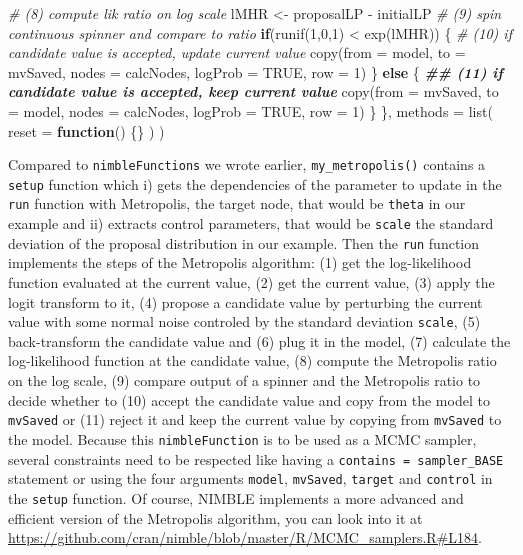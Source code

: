 \documentclass[
  12pt,
]{krantz}
\newenvironment{Shaded}{\begin{snugshade}}{\end{snugshade}}
\newcommand{\AttributeTok}[1]{\textcolor[rgb]{0.77,0.63,0.00}{#1}}
\newcommand{\CommentTok}[1]{\textcolor[rgb]{0.56,0.35,0.01}{\textit{#1}}}
\newcommand{\ConstantTok}[1]{\textcolor[rgb]{0.00,0.00,0.00}{#1}}
\newcommand{\ControlFlowTok}[1]{\textcolor[rgb]{0.13,0.29,0.53}{\textbf{#1}}}
\newcommand{\DecValTok}[1]{\textcolor[rgb]{0.00,0.00,0.81}{#1}}
\newcommand{\DocumentationTok}[1]{\textcolor[rgb]{0.56,0.35,0.01}{\textbf{\textit{#1}}}}
\newcommand{\FunctionTok}[1]{\textcolor[rgb]{0.00,0.00,0.00}{#1}}
\newcommand{\NormalTok}[1]{#1}
\newcommand{\OtherTok}[1]{\textcolor[rgb]{0.56,0.35,0.01}{#1}}
\newcommand{\SpecialCharTok}[1]{\textcolor[rgb]{0.00,0.00,0.00}{#1}}
\begin{document}
\begin{Shaded}
\begin{Highlighting}[]
    \CommentTok{\# (8) compute lik ratio on log scale}
\NormalTok{    lMHR }\OtherTok{\textless{}{-}}\NormalTok{ proposalLP }\SpecialCharTok{{-}}\NormalTok{ initialLP }
    \CommentTok{\# (9) spin continuous spinner and compare to ratio}
    \ControlFlowTok{if}\NormalTok{(}\FunctionTok{runif}\NormalTok{(}\DecValTok{1}\NormalTok{,}\DecValTok{0}\NormalTok{,}\DecValTok{1}\NormalTok{) }\SpecialCharTok{\textless{}} \FunctionTok{exp}\NormalTok{(lMHR)) \{ }
      \CommentTok{\# (10) if candidate value is accepted, update current value}
      \FunctionTok{copy}\NormalTok{(}\AttributeTok{from =}\NormalTok{ model, }\AttributeTok{to =}\NormalTok{ mvSaved, }\AttributeTok{nodes =}\NormalTok{ calcNodes, }\AttributeTok{logProb =} \ConstantTok{TRUE}\NormalTok{, }\AttributeTok{row =} \DecValTok{1}\NormalTok{)}
\NormalTok{    \} }\ControlFlowTok{else}\NormalTok{ \{}
      \DocumentationTok{\#\# (11) if candidate value is accepted, keep current value}
      \FunctionTok{copy}\NormalTok{(}\AttributeTok{from =}\NormalTok{ mvSaved, }\AttributeTok{to =}\NormalTok{ model, }\AttributeTok{nodes =}\NormalTok{ calcNodes, }\AttributeTok{logProb =} \ConstantTok{TRUE}\NormalTok{, }\AttributeTok{row =} \DecValTok{1}\NormalTok{)}
\NormalTok{    \}}
\NormalTok{  \},}
  \AttributeTok{methods =} \FunctionTok{list}\NormalTok{(}
    \AttributeTok{reset =} \ControlFlowTok{function}\NormalTok{() \{\}}
\NormalTok{  )}
\NormalTok{)}
\end{Highlighting}
\end{Shaded}

Compared to \texttt{nimbleFunctions} we wrote earlier, \texttt{my\_metropolis()} contains a \texttt{setup} function which i) gets the dependencies of the parameter to update in the \texttt{run} function with Metropolis, the target node, that would be \texttt{theta} in our example and ii) extracts control parameters, that would be \texttt{scale} the standard deviation of the proposal distribution in our example. Then the \texttt{run} function implements the steps of the Metropolis algorithm: (1) get the log-likelihood function evaluated at the current value, (2) get the current value, (3) apply the logit transform to it, (4) propose a candidate value by perturbing the current value with some normal noise controled by the standard deviation \texttt{scale}, (5) back-transform the candidate value and (6) plug it in the model, (7) calculate the log-likelihood function at the candidate value, (8) compute the Metropolis ratio on the log scale, (9) compare output of a spinner and the Metropolis ratio to decide whether to (10) accept the candidate value and copy from the model to \texttt{mvSaved} or (11) reject it and keep the current value by copying from \texttt{mvSaved} to the model. Because this \texttt{nimbleFunction} is to be used as a MCMC sampler, several constraints need to be respected like having a \texttt{contains\ =\ sampler\_BASE} statement or using the four arguments \texttt{model}, \texttt{mvSaved}, \texttt{target} and \texttt{control} in the \texttt{setup} function. Of course, NIMBLE implements a more advanced and efficient version of the Metropolis algorithm, you can look into it at \url{https://github.com/cran/nimble/blob/master/R/MCMC_samplers.R\#L184}.
\end{document}

